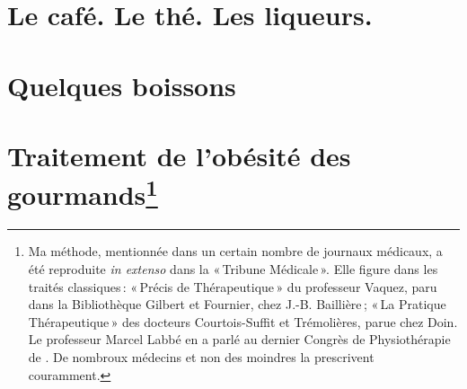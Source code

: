 \chapter*{\centering Le café. Le thé. Les liqueurs.}


\chapter*{\centering Quelques boissons}


\chapter*{\centering Traitement de l'obésité des gourmands\footnote{Ma méthode,
mentionnée dans un certain nombre de journaux médicaux, a été reproduite
\textit{in extenso} dans la « Tribune Médicale ». Elle figure dans les traités
classiques : « Précis de Thérapeutique » du professeur Vaquez, paru dans la
Bibliothèque Gilbert et Fournier, chez J.-B. Baillière ; « La Pratique
Thérapeutique » des docteurs Courtois-Suffit et Trémolières, parue chez Doin.
Le professeur Marcel Labbé en a parlé au dernier Congrès de Physiothérapie de
{\mmm}. De nombroux médecins et non des moindres la prescrivent
couramment.}}

